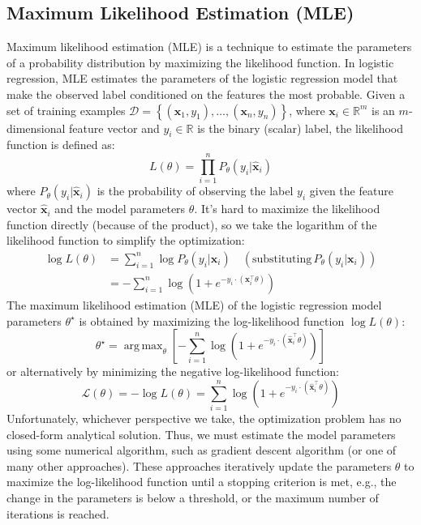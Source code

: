\documentclass{article}[11pt]
\DeclareMathOperator*{\argmax}{arg\,max}
\begin{document}
\subsection{Maximum Likelihood Estimation (MLE)}
Maximum likelihood estimation (MLE) is a technique to estimate the parameters of a probability distribution by maximizing the likelihood function.
In logistic regression, MLE estimates the parameters of the logistic regression model that make the observed label conditioned on the features the most probable.
Given a set of training examples $\mathcal{D} = \left\{\left(\mathbf{x}_{1}, y_{1}\right),\dots,\left(\mathbf{x}_{n}, y_{n}\right)\right\}$, where $\mathbf{x}_{i}\in\mathbb{R}^{m}$ is an $m$-dimensional feature vector 
and $y_{i}\in\mathbb{R}$ is the binary (scalar) label, the likelihood function is defined as:
\begin{equation}
L(\theta) = \prod_{i=1}^{n}P_{\theta}(y_{i}|\hat{\mathbf{x}}_{i})
\end{equation}
where $P_{\theta}(y_{i}|\hat{\mathbf{x}}_{i})$ is the probability of observing the label $y_{i}$ given the feature vector $\hat{\mathbf{x}}_{i}$ and the model parameters $\theta$.
It's hard to maximize the likelihood function directly (because of the product), so we take the logarithm of the likelihood function to simplify the optimization:
\begin{align*}
\log{L}(\theta) & = \sum_{i=1}^{n}\log P_{\theta}(y_{i}|\mathbf{x}_{i})\quad(\text{substituting}\,P_{\theta}(y_{i}|\mathbf{x}_{i}))\\
    & = -\sum_{i=1}^{n}\log\left(1 + e^{-y_{i}\cdot\left(\mathbf{x}_{i}^{\top}\theta\right)}\right)
\end{align*}
The maximum likelihood estimation (MLE) of the logistic regression model parameters $\theta^{\star}$ is obtained by maximizing the log-likelihood function
$\log{L}(\theta)$:
\begin{equation}
\theta^{\star} = \argmax_{\theta}\left[-\sum_{i=1}^{n}\log\left(1 + e^{-y_{i}\cdot\left(\hat{\mathbf{x}}^{\top}_{i}\theta\right)}\right)\right]
\end{equation}
or alternatively by minimizing the negative log-likelihood function:
\begin{equation}
    \mathcal{L}(\theta) =-\log{L}(\theta) = \sum_{i=1}^{n}\log\left(1 + e^{-y_{i}\cdot\left(\hat{\mathbf{x}}^{\top}_{i}\theta\right)}\right)
\end{equation}
Unfortunately, whichever perspective we take, the optimization problem has no closed-form analytical solution.
Thus, we must estimate the model parameters using some numerical algorithm, such as gradient descent algorithm (or one of many other approaches).
These approaches iteratively update the parameters $\theta$ to maximize the log-likelihood function
until a stopping criterion is met, e.g., the change in the parameters is below a threshold, or the maximum number of iterations is reached.
\end{document}
